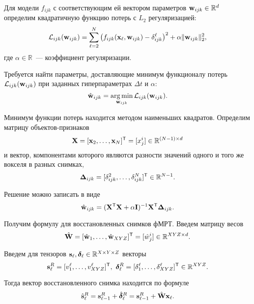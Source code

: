 \documentclass[a4paper, 12pt]{extarticle}
\begin{document}
Для модели $f_{ijk}$ с соответствующим ей вектором параметров $\mathbf{w}_{ijk} \in \mathbb{R}^{d}$
определим квадратичную функцию потерь с $L_2$ регуляризацией:
\begin{equation}
	\label{eq8}
	\mathcal{L}_{ijk}(\mathbf{w}_{ijk}) = \sum\limits_{\ell = 2}^{N} \big(f_{ijk}(\mathbf{x}_{\ell}, \mathbf{w}_{ijk}) - \delta^{\ell}_{ijk}\big)^2 + \alpha \| \mathbf{w}_{ijk} \|_2^2,
\end{equation}
где $\alpha \in \mathbb{R}$~--- коэффициент регуляризации.

Требуется найти параметры, доставляющие минимум функционалу потерь $\mathcal{L}_{ijk}(\mathbf{w}_{ijk})$
при заданных гиперпараметрах $\Delta t$ и $\alpha$:
\begin{equation}
	\label{eq9}
	\hat{\mathbf{w}}_{ijk} = \operatorname*{arg\,min}_{\mathbf{w}_{ijk}} \mathcal{L}_{ijk}(\mathbf{w}_{ijk}).
\end{equation}

Минимум функции потерь находится методом наименьших квадратов. Определим матрицу объектов-признаков
\begin{equation}
	\label{eq10}
	\mathbf{X} = [\mathbf{x}_2, \ldots, \mathbf{x}_N]^{\mathsf{T}} = [x^i_j] \in \mathbb{R}^{(N-1) \times d}
\end{equation}
и вектор, компонентами которого являются разности значений одного и того же вокселя в разных снимках,
\begin{equation}
	\label{eq11}
	\mathbf{\Delta}_{ijk} = [\delta^2_{ijk}, \ldots, \delta^N_{ijk}]^{\mathsf{T}} \in \mathbb{R}^{N-1}.
\end{equation}

Решение можно записать в виде
\begin{equation}
	\label{eq12}
	\hat{\mathbf{w}}_{ijk} = (\mathbf{X}^{\mathsf{T}} \mathbf{X} + \alpha \mathbf{I})^{-1} \mathbf{X}^{\mathsf{T}} \mathbf{\Delta}_{ijk}.
\end{equation}

Получим формулу для восстановленных снимков фМРТ. Введем матрицу весов
\begin{equation}
	\label{eq13}
	\hat{\mathbf{W}} = [\hat{\mathbf{w}}_1, \ldots, \hat{\mathbf{w}}_{XYZ}]^{\mathsf{T}} = [\hat{w}^i_j] \in \mathbb{R}^{XYZ \times d}.
\end{equation}

Введем для тензоров $\mathbf{s}_{\ell}, \boldsymbol{\delta}_{\ell} \in \mathbb{R}^{X \times Y \times Z}$ векторы
\[ \mathbf{s}_{\ell}^{R} = [ v^{\ell}_1, \ldots, v^{\ell}_{XYZ} ]^{\mathsf{T}},\
	\boldsymbol{\delta}_{\ell}^{R} = [ \delta^{\ell}_1, \ldots, \delta^{\ell}_{XYZ} ]^{\mathsf{T}} \in \mathbb{R}^{XYZ}. \]

Тогда вектор восстановленного снимка находится по формуле
\begin{equation}
	\label{eq14}
	\hat{\mathbf{s}}_{\ell}^{R} = \mathbf{s}_{\ell-1}^{R} + \hat{\boldsymbol{\delta}}_{\ell}^{R} = \mathbf{s}_{\ell-1}^{R} + \hat{\mathbf{W}} \mathbf{x}_{\ell}.
\end{equation}
\end{document}
